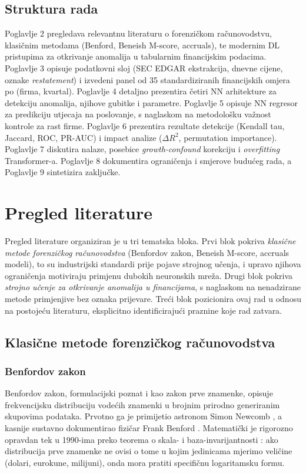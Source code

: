 \documentclass[diplomskirad,authoryear]{fer}
\begin{document}
\section{Struktura rada}

Poglavlje 2 pregledava relevantnu literaturu o forenzičkom računovodstvu, klasičnim metodama (Benford, Beneish M-score, accruals), te modernim DL pristupima za otkrivanje anomalija u tabularnim financijskim podacima. Poglavlje 3 opisuje podatkovni sloj (SEC EDGAR ekstrakcija, dnevne cijene, oznake \emph{restatement}) i izvedeni panel od 35 standardiziranih financijskih omjera po (firma, kvartal). Poglavlje 4 detaljno prezentira četiri NN arhitekture za detekciju anomalija, njihove gubitke i parametre. Poglavlje 5 opisuje NN regresor za predikciju utjecaja na poslovanje, s naglaskom na metodološku važnost kontrole za rast firme. Poglavlje 6 prezentira rezultate detekcije (Kendall tau, Jaccard, ROC, PR-AUC) i impact analize ($\Delta R^2$, permutation importance). Poglavlje 7 diskutira nalaze, posebice \emph{growth-confound} korekciju i \emph{overfitting} Transformer-a. Poglavlje 8 dokumentira ograničenja i smjerove budućeg rada, a Poglavlje 9 sintetizira zaključke.

\chapter{Pregled literature}

Pregled literature organiziran je u tri tematska bloka. Prvi blok pokriva \emph{klasične metode forenzičkog računovodstva} (Benfordov zakon, Beneish M-score, accruals modeli), to su industrijski standardi prije pojave strojnog učenja, i upravo njihova ograničenja motiviraju primjenu dubokih neuronskih mreža. Drugi blok pokriva \emph{strojno učenje za otkrivanje anomalija u financijama}, s naglaskom na nenadzirane metode primjenjive bez oznaka prijevare. Treći blok pozicionira ovaj rad u odnosu na postojeću literaturu, eksplicitno identificirajući praznine koje rad zatvara.

\section{Klasične metode forenzičkog računovodstva}

\subsection{Benfordov zakon}

Benfordov zakon, formulacijski poznat i kao zakon prve znamenke, opisuje frekvencijsku distribuciju vodećih znamenki u brojnim prirodno generiranim skupovima podataka. Prvotno ga je primijetio astronom Simon Newcomb \citep{newcomb1881}, a kasnije sustavno dokumentirao fizičar Frank Benford \citep{benford1938}. Matematički je rigorozno opravdan tek u 1990-ima preko teorema o skala- i baza-invarijantnosti \citep{hill1995}: ako distribucija prve znamenke ne ovisi o tome u kojim jedinicama mjerimo veličine (dolari, eurokune, milijuni), onda mora pratiti specifičnu logaritamsku formu.
\end{document}
